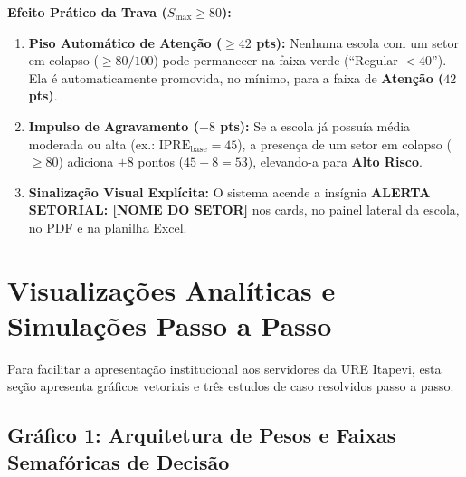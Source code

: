 \documentclass[9pt,a4paper]{extarticle}
\begin{document}
\textbf{Efeito Prático da Trava ($S_{\max} \ge 80$):}
\begin{enumerate}[leftmargin=1.5em, itemsep=2pt]
    \item \textbf{Piso Automático de Atenção ($\ge 42$ pts):} Nenhuma escola com um setor em colapso ($\ge 80/100$) pode permanecer na faixa verde (``Regular $< 40$''). Ela é automaticamente promovida, no mínimo, para a faixa de \textbf{Atenção ($42$ pts)}.
    \item \textbf{Impulso de Agravamento ($+8$ pts):} Se a escola já possuía média moderada ou alta (ex.: $\text{IPRE}_{\text{base}} = 45$), a presença de um setor em colapso ($\ge 80$) adiciona $+8$ pontos ($45 + 8 = 53$), elevando-a para \textbf{Alto Risco}.
    \item \textbf{Sinalização Visual Explícita:} O sistema acende a insígnia \textbf{\textcolor{riskCrit}{ALERTA SETORIAL: [NOME DO SETOR]}} nos cards, no painel lateral da escola, no PDF e na planilha Excel.
\end{enumerate}

\section{Visualizações Analíticas e Simulações Passo a Passo}

Para facilitar a apresentação institucional aos servidores da URE Itapevi, esta seção apresenta gráficos vetoriais e três estudos de caso resolvidos passo a passo.

\subsection{Gráfico 1: Arquitetura de Pesos e Faixas Semafóricas de Decisão}
\end{document}
